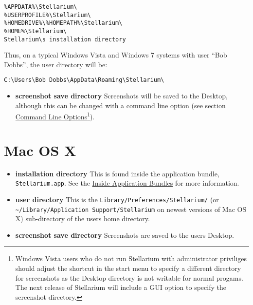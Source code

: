 \begin{config}
\texttt{\%APPDATA\%\textbackslash{}Stellarium\textbackslash{}}\\
\texttt{\%USERPROFILE\%\textbackslash{}Stellarium\textbackslash{}}\\
\texttt{\%HOMEDRIVE\%\textbackslash{}\%HOMEPATH\%\textbackslash{}Stellarium\textbackslash{}}\\
\texttt{\%HOME\%\textbackslash{}Stellarium\textbackslash{}}\\
\texttt{Stellarium\textbackslash{}s~installation~directory}
\end{config}

Thus, on a typical Windows Vista and Windows 7 systems with user ``Bob
Dobbs'', the user directory will be:

\begin{config}
\texttt{C:\textbackslash{}Users\textbackslash{}Bob~Dobbs\textbackslash{}AppData\textbackslash{}Roaming\textbackslash{}Stellarium\textbackslash{}}
\end{config}



\begin{itemize}
\item
  \textbf{screenshot save directory} Screenshots will be saved to the
  Desktop, although this can be changed with a command line option (see
  section \href{Advanced_Use\#Command_Line_Options}{Command Line
  Options}\footnote{Windows Vista users who do not run Stellarium with
    administrator priviliges should adjust the shortcut in the start
    menu to specify a different directory for screenshots as the Desktop
    directory is not writable for normal progams. The next release of
    Stellarium will include a GUI option to specify the screenshot
    directory.}).
\end{itemize}

\section{Mac OS X}\label{mac-os-x}

\begin{itemize}
\item
  \textbf{installation directory} This is found inside the application
  bundle, \texttt{Stellarium.app}. See the
  \href{http://www.mactipsandtricks.com/articles/Wiley_HT_appBundles.lasso}{Inside
  Application Bundles} for more information.
\item
  \textbf{user directory} This is the
  \texttt{Library/Preferences/Stellarium/} (or
  \texttt{\textasciitilde{}/Library/Application\ Support/Stellarium} on
  newest versions of Mac OS X) sub-directory of the users home
  directory.
\item
  \textbf{screenshot save directory} Screenshots are saved to the users
  Desktop.
\end{itemize}

